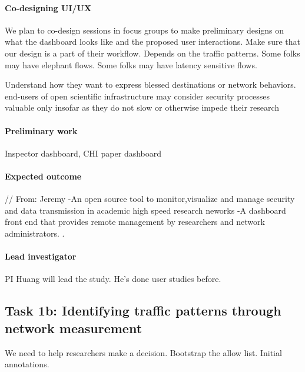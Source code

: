 \paragraph{Co-designing UI/UX}
We plan to co-design sessions in focus groups to make preliminary designs on what the dashboard looks like and the proposed user interactions. Make sure that our design is a part of their workflow. Depends on the traffic patterns. Some folks may have elephant flows. Some folks may have latency sensitive flows.

Understand how they want to express blessed destinations or network behaviors. end-users of open scientific infrastructure may consider security processes valuable only insofar as they do not slow or otherwise impede their research


\paragraph{Preliminary work}
Inspector dashboard, CHI paper dashboard

\paragraph{Expected outcome}
// From: Jeremy
-An open source tool to monitor,visualize and manage security and data transmission in academic high speed research neworks
-A dashboard front end that  provides remote management by researchers and network administrators. .

\paragraph{Lead investigator}
PI Huang will lead the study. He's done user studies before.






\subsection{Task 1b: Identifying traffic patterns through network measurement}

We need to help researchers make a decision. Bootstrap the allow list. Initial annotations.


